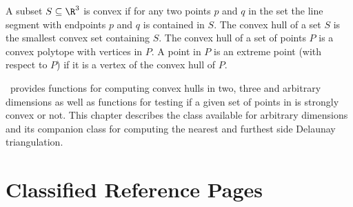 

A subset $S \subseteq \R^3$ is convex if for any two points $p$ and $q$
in the set the line segment with endpoints $p$ and $q$ is contained
in $S$. The convex hull of a set $S$ is 
the smallest convex set containing
$S$. The convex hull of a set of points $P$ is a convex 
polytope with vertices in $P$.  A point in $P$ is an extreme point 
(with respect to $P$) if it is a vertex 
of the convex hull of $P$.

\cgal\ provides functions for computing convex hulls in two, three 
and arbitrary dimensions as well as functions for testing if a given set of 
points in is strongly convex or not.  This chapter describes the class
available for arbitrary dimensions and its companion class for 
computing the nearest and furthest side Delaunay triangulation. 

\section{Classified Reference Pages}


 \\
 \\
 \\


 \\
  \\

\clearpage



